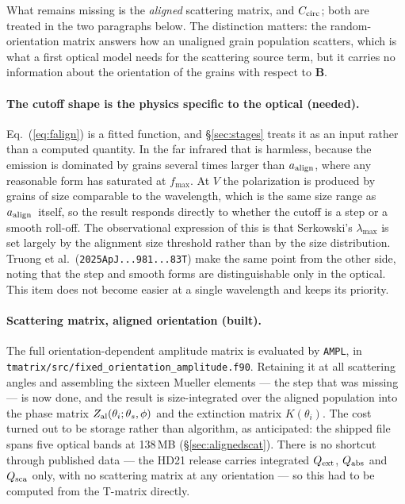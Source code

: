 \documentclass{my_memo}
\let\mathbf\boldsymbol
\newcommand{\code}[1]{\texttt{#1}}
\newcommand{\Ccirc}{\ensuremath{C_{\rm circ}}}
\newcommand{\aalign}{\ensuremath{a_{\rm align}}}
\begin{document}
What remains missing is the \emph{aligned} scattering matrix, and
\Ccirc; both are treated in the two paragraphs below. The distinction
matters: the random-orientation matrix answers how an unaligned grain
population scatters, which is what a first optical model needs for the
scattering source term, but it carries no information about the
orientation of the grains with respect to $\mathbf{B}$.

\paragraph{The cutoff shape is the physics specific to the optical
(needed).} Eq.~(\ref{eq:falign}) is a fitted function, and
\S\ref{sec:stages} treats it as an input rather than a computed
quantity. In the far infrared that is harmless, because the emission is
dominated by grains several times larger than \aalign, where any
reasonable form has saturated at $f_{\max}$. At $V$ the polarization is
produced by grains of size comparable to the wavelength, which is the
same size range as \aalign\ itself, so the result responds directly to
whether the cutoff is a step or a smooth roll-off. The observational
expression of this is that Serkowski's $\lambda_{\max}$ is set largely
by the alignment size threshold rather than by the size distribution.
Truong et al.\ (\code{2025ApJ...981...83T}) make the same point from the
other side, noting that the step and smooth forms are distinguishable
only in the optical. This item does not become easier at a single
wavelength and keeps its priority.

\paragraph{Scattering matrix, aligned orientation (built).} The full
orientation-dependent amplitude matrix is evaluated by \code{AMPL}, in
\code{tmatrix/src/fixed\_orientation\_amplitude.f90}. Retaining it at all
scattering angles and assembling
the sixteen Mueller elements --- the step that was missing --- is now done, and
the result is size-integrated over the aligned population into the phase matrix
$Z_{\rm al}(\theta_i;\theta_s,\phi)$ and the extinction matrix $K(\theta_i)$. The
cost turned out to be storage rather than algorithm, as anticipated: the shipped
file spans five optical bands at 138\,MB (\S\ref{sec:alignedscat}). There is no
shortcut through published data --- the HD21 release carries integrated
$Q_{\rm ext}$, $Q_{\rm abs}$ and $Q_{\rm sca}$ only, with no scattering matrix at
any orientation --- so this had to be computed from the T-matrix directly.
\end{document}
